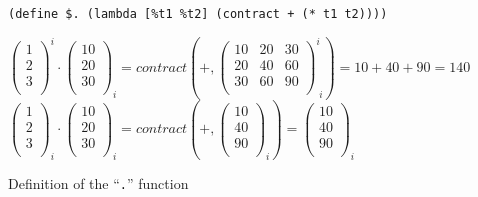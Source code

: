\documentclass[acmlarge]{acmart}
\begin{document}
\begin{figure}[t]
  {\footnotesize
\verb|(define $. (lambda [%t1 %t2] (contract + (* t1 t2))))|
  }
  \caption{Definition of the ``\texttt{.}'' function}
  \label{fig:dotFunction}
  \medskip
  {\small
  $\begin{pmatrix} 1 \\ 2 \\ 3 \\ \end{pmatrix}^{i} \cdot \begin{pmatrix} 10 \\ 20 \\ 30 \\ \end{pmatrix}_{i} = contract(+, \begin{pmatrix} 10 & 20 & 30 \\ 20 & 40 & 60 \\ 30 & 60 & 90 \\ \end{pmatrix}^{i}_{\;i})
  = 10 + 40 + 90 = 140$
  \\
  $\begin{pmatrix} 1 \\ 2 \\ 3 \\ \end{pmatrix}_{i} \cdot \begin{pmatrix} 10 \\ 20 \\ 30 \\ \end{pmatrix}_{i} = contract(+, \begin{pmatrix} 10 \\ 40 \\ 90 \\ \end{pmatrix}_{i}) = \begin{pmatrix} 10 \\ 40 \\ 90 \\ \end{pmatrix}_{i}$
}
\end{figure}
\end{document}
